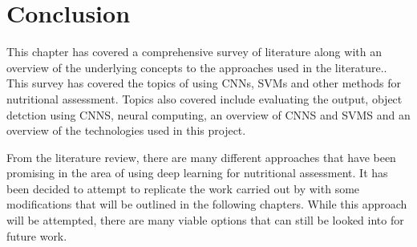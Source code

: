 \section{Conclusion}
This chapter has covered a comprehensive survey of literature along with an overview of the underlying concepts to the approaches used in the literature..
This survey has covered the topics of using CNNs, SVMs and other methods for nutritional assessment.
Topics also covered include evaluating the output, object detction using CNNS, neural computing, an overview of CNNS and SVMS and an overview of the technologies used in this project.

From the literature review, there are many different approaches that have been promising in the area of using deep learning for nutritional assessment.
It has been decided to attempt to replicate the work carried out by \parencite{yanaiFood} with some modifications that will be outlined in the following chapters.
While this approach will be attempted, there are many viable options that can still be looked into for future work.


